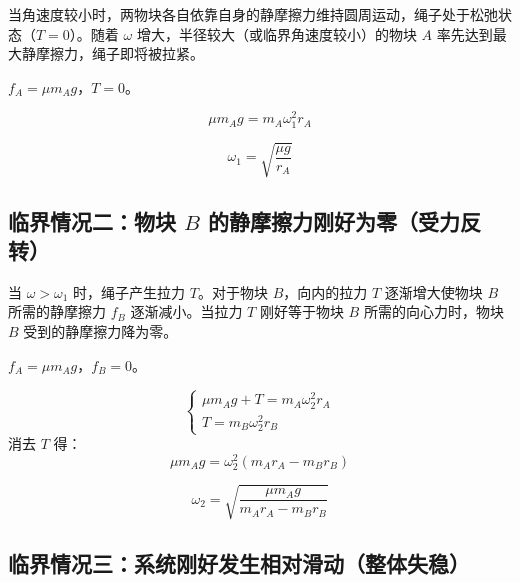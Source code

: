 \documentclass[12pt,a4paper]{ctexart}
\begin{document}
\begin{description}[leftmargin=1.5cm,style=nextline]
  \item[物理机制] 当角速度较小时，两物块各自依靠自身的静摩擦力维持圆周运动，绳子处于松弛状态（$T = 0$）。随着 $\omega$ 增大，半径较大（或临界角速度较小）的物块 $A$ 率先达到最大静摩擦力，绳子即将被拉紧。
  \item[临界条件] $f_A = \mu m_A g$，$T = 0$。
  \item[代数推导]
  \begin{equation}
  \mu m_A g = m_A \omega_1^2 r_A
  \end{equation}
  \item[临界角速度]
  \begin{equation}
  \boxed{\omega_1 = \sqrt{\frac{\mu g}{r_A}}}
  \end{equation}
\end{description}

\subsection{临界情况二：物块 $B$ 的静摩擦力刚好为零（受力反转）}

\begin{description}[leftmargin=1.5cm,style=nextline]
  \item[物理机制] 当 $\omega > \omega_1$ 时，绳子产生拉力 $T$。对于物块 $B$，向内的拉力 $T$ 逐渐增大使物块 $B$ 所需的静摩擦力 $f_B$ 逐渐减小。当拉力 $T$ 刚好等于物块 $B$ 所需的向心力时，物块 $B$ 受到的静摩擦力降为零。
  \item[临界条件] $f_A = \mu m_A g$，$f_B = 0$。
  \item[代数推导]
  \begin{equation}
  \begin{cases}
  \mu m_A g + T = m_A \omega_2^2 r_A \\[6pt]
  T = m_B \omega_2^2 r_B
  \end{cases}
  \end{equation}
  消去 $T$ 得：
  \begin{equation}
  \mu m_A g = \omega_2^2 (m_A r_A - m_B r_B)
  \end{equation}
  \item[临界角速度]
  \begin{equation}
  \boxed{\omega_2 = \sqrt{\frac{\mu m_A g}{m_A r_A - m_B r_B}}}
  \end{equation}
\end{description}

\subsection{临界情况三：系统刚好发生相对滑动（整体失稳）}
\end{document}
